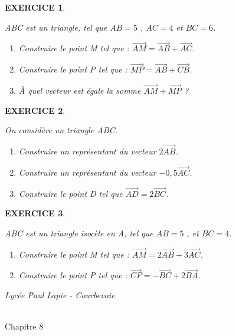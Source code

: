 \documentclass[a4paper]{article}   %
\renewcommand{\(}{\left(}
\renewcommand{\)}{\right)}
\newtheorem{EXO}{\large EXERCICE }
\newenvironment{EX}   { \setcounter{ques}{0} \begin{EXO} \hrulefill ~\vspace{0.3cm}

\normalfont}    {\end{EXO} \medskip}
\def\v{\overrightarrow}	%
\def\cl{{\Large \bf{2nde}}}
\begin{document}
\begin{EX} ABC est un triangle, tel que $AB=5$ , $AC=4$ et $BC=6$. \begin{enumerate}
\item Construire le point M tel que : $\v{AM}=\v{AB}+\v{AC}$.
\item Construire le point P tel que : $\v{MP}=\v{AB}+\v{CB}$.
\item \`A quel vecteur est égale la somme $\v{AM}+\v{MP}$ ?
\end{enumerate}
\end{EX}

\begin{EX} On considère un triangle ABC. \begin{enumerate}
\item Construire un représentant du vecteur $2\v{AB}$.
\item Construire un représentant du vecteur $-0,5\v{AC}$.
\item Construire le point D tel que $\v{AD}=2\v{BC}$.
\end{enumerate}
\end{EX}


\begin{EX} ABC est un triangle isocèle en A, tel que $AB=5$ , et $BC=4$. \begin{enumerate}
\item Construire le point M tel que : $\v{AM}=2\v{AB}+3\v{AC}$.
\item Construire le point P tel que : $\v{CP}=-\v{BC}+2\v{BA}$.
\end{enumerate}
\end{EX}


\newpage

\noindent\begin{minipage}{.20\linewidth}\begin{center}                  
\noindent \emph{Lycée Paul Lapie - Courbevoie}
\end{center}\end{minipage}
\begin{minipage}{1.5\linewidth}\begin{center}	
\noindent \cl\\ Chapitre 8
\end{center}\end{minipage}

\begin{center} 	
\end{center}
\end{document}

